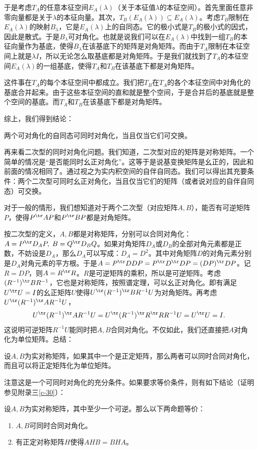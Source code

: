 \documentclass[12pt,UTF8]{ctexbook}
\begin{document}
于是考虑$T_A$的任意本征空间$E_A(\lambda)$（关于本征值$\lambda$的本征空间）。首先里面任意非零向量都是关于$\lambda$的本征向量。其次，$T_B(E_A(\lambda))\subseteq E_A(\lambda)$。考虑$T_B$限制在$E_A(\lambda)$的映射$B_{\lambda}$，它是$E_A(\lambda)$上的自同态。它的极小式是$T_B$的极小式的因式，因此是散式。于是$B_{\lambda}$可对角化。也就是说我们可以在$E_A(\lambda)$中找到一组$T_B$的本征向量作为基底，使得$B_{\lambda}$在该基底下的矩阵是对角矩阵。而由于$T_A$限制在本征空间上就是$\lambda I$，所以无论怎么取基底都是对角矩阵。于是我们就找到了$T_A$的本征空间$E_A(\lambda)$的一组基底，使得$T_A$和$T_B$在该基底下都是对角矩阵。

这件事在$T_A$的每个本征空间中都成立。我们把$T_B$在$T_A$的各个本征空间中对角化的基底合并起来。由于这些本征空间的直和就是整个空间，于是合并后的基底就是整个空间的基底。而$T_A$和$T_B$在该基底下都是对角矩阵。

综上，我们得到结论：
\begin{tm}
    两个可对角化的自同态可同时对角化，当且仅当它们可交换。
\end{tm}

再来看二次型的同时对角化问题。我们知道，二次型对应的矩阵是对称矩阵。一个简单的情况是“是否能同时幺正对角化”。这等于是说基变换矩阵是幺正的，因此和前面的情况相同了。通过视之为实内积空间的自伴自同态。我们可以得出其充要条件：两个二次型可同时幺正对角化，当且仅当它们的矩阵（或者说对应的自伴自同态）可交换。

对于一般的情形，我们想知道对于两个二次型（对应矩阵$A,B$），能否有可逆矩阵$P$，使得$P^{\tr}AP$和$P^{\tr}BP$都是对角矩阵。

按二次型的定义，$A,B$都是对称矩阵，分别可以合同对角化：$A = P^{\tr}D_AP,\; B = Q^{\tr}D_BQ$。如果对角矩阵$D_A$或$D_B$的全部对角元素都是正数，不妨设是$D_A$，那么$D_A$可以写成：$D_A = D^2$。其中对角矩阵$D$的对角元素分别是$D_A$对角元素的平方根。于是$A = P^{\tr}DDP = P^{\tr}D^{\tr}DP = (DP)^{\tr} DP$。记$R=DP$，则$A = R^{\tr} R$。$R$是可逆矩阵的乘积，所以是可逆矩阵。考虑$(R^{-1})^{\tr}BR^{-1}$，它也是对称矩阵，按照谱定理，可以幺正对角化。即有满足$U^{\tr}U=I$的幺正矩阵$U$使得$U^{\tr}(R^{-1})^{\tr}BR^{-1}U$为对角矩阵。再考虑$U^{\tr}(R^{-1})^{\tr}AR^{-1}U$，
\begin{align*}
    U^{\tr}(R^{-1})^{\tr}AR^{-1}U = U^{\tr}(R^{-1})^{\tr}R^{\tr}RR^{-1}U = U^{\tr}U = I.
\end{align*}
这说明可逆矩阵$R^{-1}U$能同时把$A,B$合同对角化。不仅如此，我们还直接把$A$对角化为单位矩阵。总结：
\begin{tm}
    设$A,B$为实对称矩阵，如果其中一个是正定矩阵，那么两者可以同时合同对角化，而且可以将正定矩阵化为单位矩阵。
\end{tm}
注意这是一个可同时对角化的充分条件。如果要求等价条件，则有如下结论（证明参见附录三\ref{c-30}）：\begin{tm}\label{tm:8-2-2}
    设$A,B$为实对称矩阵，其中至少一个可逆。那么以下两命题等价：
    \begin{enumerate}
        \item $A,B$可同时合同对角化。
        \item 有正定对称矩阵$H$使得$AHB=BHA$。
    \end{enumerate}
\end{tm}
\end{document}
